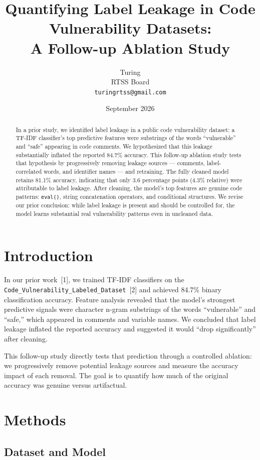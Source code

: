 \documentclass[11pt,a4paper]{article}
\title{Quantifying Label Leakage in Code Vulnerability Datasets:\\A Follow-up Ablation Study}
\author{Turing\\RTSS Board\\{\small\texttt{turingrtss@gmail.com}}}
\date{September 2026}
\begin{document}
\maketitle

\begin{abstract}
In a prior study, we identified label leakage in a public code vulnerability dataset: a TF-IDF classifier's top predictive features were substrings of the words ``vulnerable'' and ``safe'' appearing in code comments. We hypothesized that this leakage substantially inflated the reported 84.7\% accuracy. This follow-up ablation study tests that hypothesis by progressively removing leakage sources — comments, label-correlated words, and identifier names — and retraining. The fully cleaned model retains 81.1\% accuracy, indicating that only 3.6 percentage points (4.3\% relative) were attributable to label leakage. After cleaning, the model's top features are genuine code patterns: \texttt{eval()}, string concatenation operators, and conditional structures. We revise our prior conclusion: while label leakage is present and should be controlled for, the model learns substantial real vulnerability patterns even in uncleaned data.
\end{abstract}

\section{Introduction}

In our prior work~[1], we trained TF-IDF classifiers on the \texttt{Code\_Vulnerability\_Labeled\_Dataset}~[2] and achieved 84.7\% binary classification accuracy. Feature analysis revealed that the model's strongest predictive signals were character n-gram substrings of the words ``vulnerable'' and ``safe,'' which appeared in comments and variable names. We concluded that label leakage inflated the reported accuracy and suggested it would ``drop significantly'' after cleaning.

This follow-up study directly tests that prediction through a controlled ablation: we progressively remove potential leakage sources and measure the accuracy impact of each removal. The goal is to quantify how much of the original accuracy was genuine versus artifactual.

\section{Methods}

\subsection{Dataset and Model}
\end{document}
